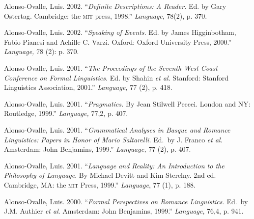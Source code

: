 \documentclass[11pt]{article}
\begin{document}
Alonso-Ovalle, Luis. 2002. ``\textit{Definite Descriptions: A Reader.} Ed. by Gary Ostertag. Cambridge: the \textsc{mit} press, 1998.''  \textit{Language}, 78(2), p. 370.

Alonso-Ovalle, Luis. 2002. ``\textit{Speaking of Events.} Ed. by James Higginbotham, Fabio Pianesi and Achille C. Varzi. Oxford: Oxford University Press, 2000.'' \textit{Language,} 78 (2): p. 370.

Alonso-Ovalle, Luis. 2001. ``\textit{The Proceedings of the Seventh West Coast Conference on Formal Linguistics.} Ed. by Shahin \textit{et al}. Stanford: Stanford Linguistics Association, 2001.'' {\it Language,} 77 (2), p. 418.

Alonso-Ovalle, Luis. 2001. ``{\it Pragmatics.} By Jean Stilwell Peccei. London and NY: Routledge, 1999.'' {\it Language,} 77,2, p. 407.

Alonso-Ovalle, Luis. 2001. ``{\it Grammatical Analyses in Basque and Romance Linguistics: Papers in Honor of Mario Saltarelli.} Ed.\ by J. Franco \textit{et al}. Amsterdam: John Benjamins, 1999.'' {\it Language,} 77 (2), p. 407.

Alonso-Ovalle, Luis. 2001. ``{\it Language and Reality: An Introduction to the Philosophy of Language}. By  Michael Devitt and Kim Sterelny. 2nd ed. Cambridge, MA: the \textsc{mit} Press, 1999.'' {\it Language}, 77 (1), p. 188.

Alonso-Ovalle, Luis. 2000. ``{\it Formal Perspectives on Romance Linguistics.} Ed.\ by J.M. Authier \textit{et al}. Amsterdam: John Benjamins, 1999.'' {\it Language}, 76,4, p. 941.
 


\end{document}
